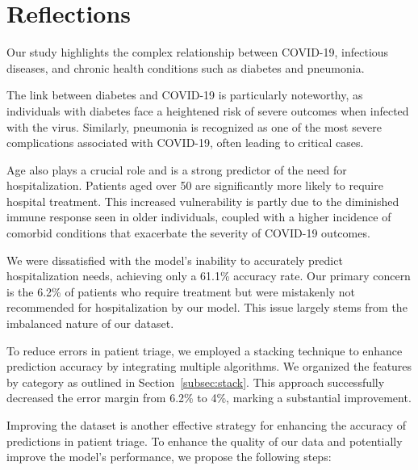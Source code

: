 \section{Reflections}

Our study highlights the complex relationship between COVID-19, 
infectious diseases, and chronic health conditions such as diabetes and
pneumonia.

The link between diabetes and COVID-19 is particularly noteworthy, as 
individuals with diabetes face a heightened risk of severe outcomes
when infected with the virus. Similarly, pneumonia is recognized as 
one of the most severe complications associated with COVID-19, 
often leading to critical cases.

Age also plays a crucial role and is a strong predictor of the need for
hospitalization. Patients aged over 50 are significantly more likely to 
require hospital treatment. This increased vulnerability is partly due 
to the diminished immune response seen in older individuals, coupled 
with a higher incidence of comorbid conditions that exacerbate the 
severity of COVID-19 outcomes.

We were dissatisfied with the model's inability to accurately predict 
hospitalization needs, achieving only a 61.1\% accuracy rate. 
Our primary concern is the 6.2\% of patients who require treatment 
but were mistakenly not recommended for hospitalization by our 
model. This issue largely stems from the imbalanced nature of 
our dataset. 

To reduce errors in patient triage, we employed a stacking technique to 
enhance prediction accuracy by integrating multiple algorithms. We organized
the features by category as outlined in Section~\ref{subsec:stack}. This
approach successfully decreased the error margin from 6.2\% to 4\%, marking
a substantial improvement.

Improving the dataset is another effective strategy for enhancing the 
accuracy of predictions in patient triage.
To enhance the quality of our data and potentially 
improve the model's performance, we propose the following steps:

